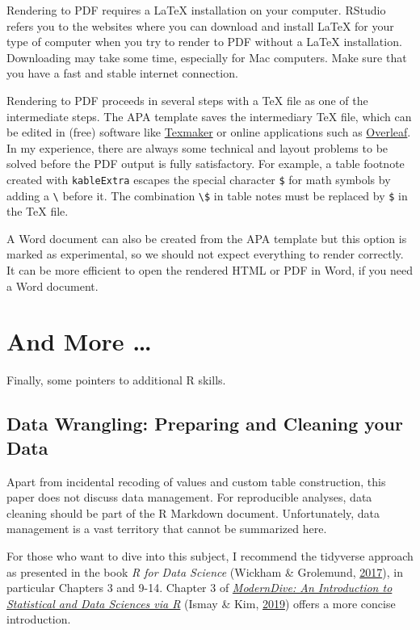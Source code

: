 \documentclass[doc,floatsintext]{apa6}
\begin{document}
Rendering to PDF requires a LaTeX installation on your computer. RStudio
refers you to the websites where you can download and install LaTeX for
your type of computer when you try to render to PDF without a LaTeX
installation. Downloading may take some time, especially for Mac
computers. Make sure that you have a fast and stable internet
connection.

Rendering to PDF proceeds in several steps with a TeX file as one of the
intermediate steps. The APA template saves the intermediary TeX file,
which can be edited in (free) software like
\href{https://www.xm1math.net/texmaker/}{Texmaker} or online
applications such as \href{https://www.overleaf.com/}{Overleaf}. In my
experience, there are always some technical and layout problems to be
solved before the PDF output is fully satisfactory. For example, a table
footnote created with \texttt{kableExtra} escapes the special character
\texttt{\$} for math symbols by adding a \texttt{\textbackslash{}}
before it. The combination \texttt{\textbackslash{}\$} in table notes
must be replaced by \texttt{\$} in the TeX file.

A Word document can also be created from the APA template but this
option is marked as experimental, so we should not expect everything to
render correctly. It can be more efficient to open the rendered HTML or
PDF in Word, if you need a Word document.

\section{And More \ldots{}}\label{and-more}

Finally, some pointers to additional R skills.

\subsection{Data Wrangling: Preparing and Cleaning your
Data}\label{data-wrangling-preparing-and-cleaning-your-data}

Apart from incidental recoding of values and custom table construction,
this paper does not discuss data management. For reproducible analyses,
data cleaning should be part of the R Markdown document. Unfortunately,
data management is a vast territory that cannot be summarized here.

For those who want to dive into this subject, I recommend the tidyverse
approach as presented in the book \emph{R for Data Science} (Wickham \&
Grolemund, \protect\hyperlink{ref-WickhamDataScienceImport2017}{2017}),
in particular Chapters 3 and 9-14. Chapter 3 of
\href{https://moderndive.com/index.html}{\emph{ModernDive: An
Introduction to Statistical and Data Sciences via R}} (Ismay \& Kim,
\protect\hyperlink{ref-IsmayIntroductionStatisticalData}{2019}) offers a
more concise introduction.
\end{document}
